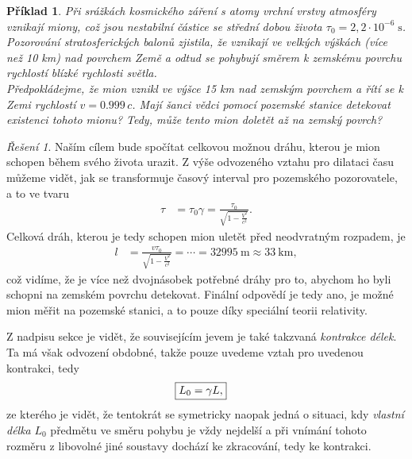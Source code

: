 \documentclass[11pt,a4paper]{report}
\theoremstyle{theorem}
\newtheorem*{example}{Příklad}
\theoremstyle{remark}
\newtheorem*{solution}{Řešení}
\theoremstyle{definition}
\begin{document}
			\begin{example}
				Při srážkách kosmického záření s atomy vrchní vrstvy atmosféry vznikají miony, což jsou nestabilní částice se střední dobou života $\tau_0 = 2,2 \cdot 10^{-6} \; \mathrm s$. Pozorování stratosferických balonů zjistila, že vznikají ve velkých výškách (více než 10 km) nad povrchem Země a odtud se pohybují směrem k zemskému povrchu rychlostí blízké rychlosti světla.
			\\
				Předpokládejme, že mion vznikl ve výšce 15 km nad zemským povrchem a řítí se k Zemi rychlostí $v = 0.999 \, c$. Mají šanci vědci pomocí pozemské stanice detekovat existenci tohoto mionu? Tedy, může tento mion doletět až na zemský povrch?
			\end{example}
			\begin{solution}
				Naším cílem bude spočítat celkovou možnou dráhu, kterou je mion schopen během svého života urazit. Z výše odvozeného vztahu pro dilataci času můžeme vidět, jak se transformuje časový interval pro pozemského pozorovatele, a to ve tvaru
				\begin{align*}
					\tau &= \tau_0 \gamma = \frac{\tau_0}{\sqrt{1 - \frac{V^2}{c^2}}}.
				\end{align*}
				Celková dráh, kterou je tedy schopen mion uletět před neodvratným rozpadem, je
				\begin{align*}
					l &= \frac{v\tau_0}{\sqrt{1 - \frac{V^2}{c^2}}} = \cdots = 32995 \ \mathrm m \approx 33 \ \mathrm{km},
				\end{align*}
				což vidíme, že je více než dvojnásobek potřebné dráhy pro to, abychom ho byli schopni na zemském povrchu detekovat. Finální odpovědí je tedy ano, je možné mion měřit na pozemské stanici, a to pouze díky speciální teorii relativity.
			\end{solution}
			
			Z nadpisu sekce je vidět, že souvisejícím jevem je také takzvaná \textit{kontrakce délek}. Ta má však odvození obdobné, takže pouze uvedeme vztah pro uvedenou kontrakci, tedy
			\begin{align*}
				\Aboxed{L_0 = \gamma L,}
			\end{align*}
			ze kterého je vidět, že tentokrát se symetricky naopak jedná o situaci, kdy \textit{vlastní délka} $L_0$ předmětu ve směru pohybu je vždy nejdelší a při vnímání tohoto rozměru z libovolné jiné soustavy dochází ke zkracování, tedy ke kontrakci.
		
\end{document}
